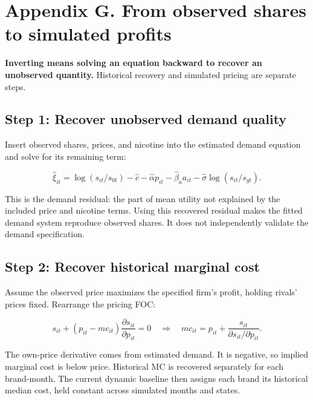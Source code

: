 \documentclass[11pt,]{article}
\begin{document}


\clearpage

\section{Appendix G. From observed shares to simulated
profits}\label{appendix-g.-from-observed-shares-to-simulated-profits}

\textbf{Inverting means solving an equation backward to recover an
unobserved quantity.} Historical recovery and simulated pricing are
separate steps.

\subsection{Step 1: Recover unobserved demand
quality}\label{step-1-recover-unobserved-demand-quality}

Insert observed shares, prices, and nicotine into the estimated demand
equation and solve for its remaining term:

\[
\widehat\xi_{it}=\log(s_{it}/s_{0t})-\widehat c
-\widehat\alpha p_{it}-\widehat\beta_a a_{it}
-\widehat\sigma\log(s_{it}/s_{gt}).
\]

This is the demand residual: the part of mean utility not explained by
the included price and nicotine terms. Using this recovered residual
makes the fitted demand system reproduce observed shares. It does not
independently validate the demand specification.

\subsection{Step 2: Recover historical marginal
cost}\label{step-2-recover-historical-marginal-cost}

Assume the observed price maximizes the specified firm's profit, holding
rivals' prices fixed. Rearrange the pricing FOC:

\[
s_{it}+(p_{it}-mc_{it})\frac{\partial s_{it}}{\partial p_{it}}=0
\quad\Longrightarrow\quad
mc_{it}=p_{it}+\frac{s_{it}}{\partial s_{it}/\partial p_{it}}.
\]

The own-price derivative comes from estimated demand. It is negative, so
implied marginal cost is below price. Historical MC is recovered
separately for each brand-month. The current dynamic baseline then
assigns each brand its historical median cost, held constant across
simulated months and states.
\end{document}
